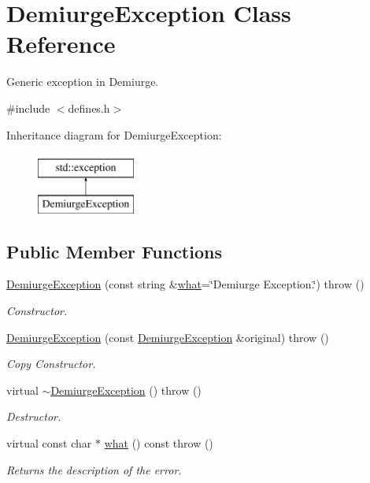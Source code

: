\hypertarget{classDemiurgeException}{\section{Demiurge\-Exception Class Reference}
\label{classDemiurgeException}
}


Generic exception in Demiurge.  




{\ttfamily \#include $<$defines.\-h$>$}

Inheritance diagram for Demiurge\-Exception\-:\begin{figure}[H]
\begin{center}
\leavevmode
\includegraphics[height=2.000000cm]{classDemiurgeException}
\end{center}
\end{figure}
\subsection*{Public Member Functions}
\begin{DoxyCompactItemize}
\item 
\hyperlink{classDemiurgeException_af4239735e6a4e3209056891db9690042}{Demiurge\-Exception} (const string \&\hyperlink{classDemiurgeException_a054ca589bdea4f3108be0f96ae3aa1ca}{what}=\char`\"{}Demiurge Exception.\char`\"{})  throw ()
\begin{DoxyCompactList}\small\item\em Constructor. \end{DoxyCompactList}\item 
\hyperlink{classDemiurgeException_a299ea8dda58f965373f6377e7dd0ca57}{Demiurge\-Exception} (const \hyperlink{classDemiurgeException}{Demiurge\-Exception} \&original)  throw ()
\begin{DoxyCompactList}\small\item\em Copy Constructor. \end{DoxyCompactList}\item 
virtual \hyperlink{classDemiurgeException_af1af32c87e6075441fe790fc7a1d9d71}{$\sim$\-Demiurge\-Exception} ()  throw ()
\begin{DoxyCompactList}\small\item\em Destructor. \end{DoxyCompactList}\item 
virtual const char $\ast$ \hyperlink{classDemiurgeException_a054ca589bdea4f3108be0f96ae3aa1ca}{what} () const   throw ()
\begin{DoxyCompactList}\small\item\em Returns the description of the error. \end{DoxyCompactList}\end{DoxyCompactItemize}
